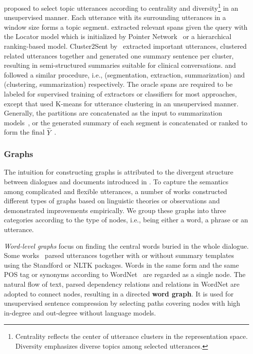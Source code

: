 \citet{zou2021unsupervised} proposed to select topic utterances according to 
centrality and diversity\footnote{Centrality reflects the center of utterance clusters in the representation space. Diversity emphasizes diverse topics among selected utterances.} in an unsupervised manner. Each utterance with its surrounding utterances in a window size forms a topic segment.
\citet{zhong2021qmsum} extracted relevant spans given the query with the Locator model which is initialized by Pointer Network~\cite{vinyals2015pointer} or a hierarchical ranking-based model. 
Cluster2Sent by~\citet{krishna2021generating} extracted important utterances, clustered related utterances together and generated one summary sentence per cluster, resulting in semi-structured summaries suitable for clinical conversations. 
\citet{banerjee2015generating} and \citet{shang2018unsupervised} followed a similar procedure, i.e., (segmentation, extraction,  summarization) and (clustering, summarization) respectively.
The oracle spans are required to be labeled for supervised training of extractors or classifiers for most approaches, except that \citet{shang2018unsupervised} used K-means for utterance clustering in an unsupervised manner.
Generally, the partitions are concatenated as the input to summarization models~\cite{zhong2021qmsum}, or the generated summary of each segment is concatenated or ranked to form the final $\hat{Y}$~\cite{zou2021unsupervised,banerjee2015generating}.



\subsubsection{Graphs} 
\label{sec:graphs}

The intuition for constructing graphs is attributed to the divergent structure between dialogues and documents introduced in . To capture the semantics among complicated and flexible utterances, a number of works constructed different types of graphs based on linguistic theories or observations and demonstrated improvements empirically. We group these graphs into three categories according to the type of 
nodes, i.e., being either a word, a phrase or an utterance. 

\textit{Word-level graphs} focus on finding the central words buried in the whole dialogue. Some works~\cite{OyaMCN14,banerjee2015generating,shang2018unsupervised,park2022unsupervised} parsed utterances together with or without summary templates using the Standford or NLTK packages. Words in the same form and the same POS tag or synonyms according to WordNet~\cite{MehdadCTN13} are regarded as a single node. The natural flow of text, parsed dependency relations and relations in WordNet are adopted to connect nodes, resulting in a directed \textbf{word graph}. It is used for unsupervised sentence compression by selecting paths covering nodes with high in-degree and out-degree without language models.

